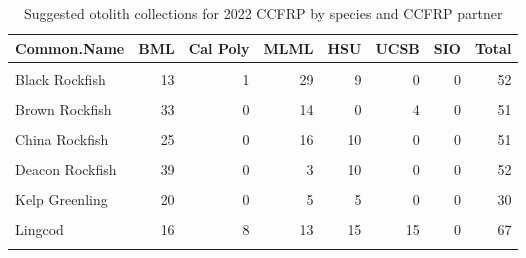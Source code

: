 \documentclass[
]{article}
\begin{document}
\begin{table}

\caption{\label{tab:collections}Suggested otolith collections for 2022 CCFRP by species and CCFRP partner}
\centering
\begin{tabular}[t]{lrrrrrrr}
\toprule
Common.Name & BML & Cal Poly & MLML & HSU & UCSB & SIO & Total\\
\midrule
\cellcolor{gray!6}{Black-and-Yellow Rockfish} & \cellcolor{gray!6}{7} & \cellcolor{gray!6}{4} & \cellcolor{gray!6}{7} & \cellcolor{gray!6}{0} & \cellcolor{gray!6}{0} & \cellcolor{gray!6}{0} & \cellcolor{gray!6}{18}\\
Black Rockfish & 13 & 1 & 29 & 9 & 0 & 0 & 52\\
\cellcolor{gray!6}{Blue Rockfish} & \cellcolor{gray!6}{7} & \cellcolor{gray!6}{20} & \cellcolor{gray!6}{23} & \cellcolor{gray!6}{2} & \cellcolor{gray!6}{50} & \cellcolor{gray!6}{0} & \cellcolor{gray!6}{102}\\
Brown Rockfish & 33 & 0 & 14 & 0 & 4 & 0 & 51\\
\cellcolor{gray!6}{Canary Rockfish} & \cellcolor{gray!6}{26} & \cellcolor{gray!6}{0} & \cellcolor{gray!6}{2} & \cellcolor{gray!6}{23} & \cellcolor{gray!6}{0} & \cellcolor{gray!6}{0} & \cellcolor{gray!6}{51}\\
\addlinespace
China Rockfish & 25 & 0 & 16 & 10 & 0 & 0 & 51\\
\cellcolor{gray!6}{Copper Rockfish} & \cellcolor{gray!6}{19} & \cellcolor{gray!6}{10} & \cellcolor{gray!6}{5} & \cellcolor{gray!6}{18} & \cellcolor{gray!6}{50} & \cellcolor{gray!6}{0} & \cellcolor{gray!6}{102}\\
Deacon Rockfish & 39 & 0 & 3 & 10 & 0 & 0 & 52\\
\cellcolor{gray!6}{Gopher Rockfish} & \cellcolor{gray!6}{11} & \cellcolor{gray!6}{20} & \cellcolor{gray!6}{21} & \cellcolor{gray!6}{1} & \cellcolor{gray!6}{35} & \cellcolor{gray!6}{4} & \cellcolor{gray!6}{92}\\
Kelp Greenling & 20 & 0 & 5 & 5 & 0 & 0 & 30\\
\addlinespace
\cellcolor{gray!6}{Kelp Rockfish} & \cellcolor{gray!6}{0} & \cellcolor{gray!6}{18} & \cellcolor{gray!6}{9} & \cellcolor{gray!6}{0} & \cellcolor{gray!6}{9} & \cellcolor{gray!6}{14} & \cellcolor{gray!6}{50}\\
Lingcod & 16 & 8 & 13 & 15 & 15 & 0 & 67\\
\cellcolor{gray!6}{Olive Rockfish} & \cellcolor{gray!6}{6} & \cellcolor{gray!6}{22} & \cellcolor{gray!6}{21} & \cellcolor{gray!6}{3} & \cellcolor{gray!6}{4} & \cellcolor{gray!6}{4} & \cellcolor{gray!6}{60}\\

\end{tabular}
\end{table}
\end{document}
